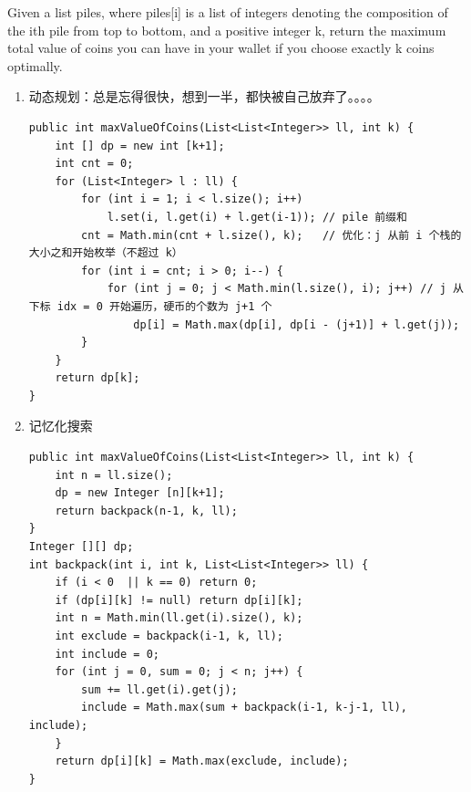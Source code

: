 \documentclass[9pt, b5paaper]{book}
\begin{document}
Given a list piles, where piles[i] is a list of integers denoting the composition of the ith pile from top to bottom, and a positive integer k, return the maximum total value of coins you can have in your wallet if you choose exactly k coins optimally.
\begin{enumerate}
\item 动态规划：总是忘得很快，想到一半，都快被自己放弃了。。。。
\label{sec-1-1-3-1}
\begin{verbatim}
public int maxValueOfCoins(List<List<Integer>> ll, int k) {
    int [] dp = new int [k+1];
    int cnt = 0;
    for (List<Integer> l : ll) {
        for (int i = 1; i < l.size(); i++)
            l.set(i, l.get(i) + l.get(i-1)); // pile 前缀和
        cnt = Math.min(cnt + l.size(), k);   // 优化：j 从前 i 个栈的大小之和开始枚举（不超过 k）
        for (int i = cnt; i > 0; i--) {
            for (int j = 0; j < Math.min(l.size(), i); j++) // j 从下标 idx = 0 开始遍历，硬币的个数为 j+1 个
                dp[i] = Math.max(dp[i], dp[i - (j+1)] + l.get(j));
        }
    }
    return dp[k];
}
\end{verbatim}
\item 记忆化搜索
\label{sec-1-1-3-2}
\begin{verbatim}
public int maxValueOfCoins(List<List<Integer>> ll, int k) {
    int n = ll.size();
    dp = new Integer [n][k+1];
    return backpack(n-1, k, ll);
}
Integer [][] dp;
int backpack(int i, int k, List<List<Integer>> ll) {
    if (i < 0  || k == 0) return 0;
    if (dp[i][k] != null) return dp[i][k];
    int n = Math.min(ll.get(i).size(), k);
    int exclude = backpack(i-1, k, ll);
    int include = 0;
    for (int j = 0, sum = 0; j < n; j++) {
        sum += ll.get(i).get(j);
        include = Math.max(sum + backpack(i-1, k-j-1, ll), include);
    }
    return dp[i][k] = Math.max(exclude, include);
}
\end{verbatim}
\end{enumerate}
\end{document}

